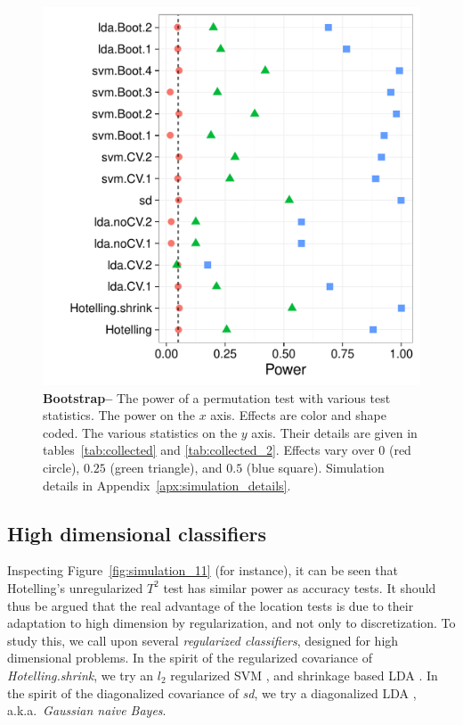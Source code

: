 \documentclass[12pt,a4paper]{article}
\begin{document}
\begin{figure}[ht]
\centering
	  \includegraphics[width=0.7\linewidth]{"art/2016-08-30 18:08:08"}
	  \caption{
		  \textbf{Bootstrap--}
		  The power of a permutation test with various test statistics. 
		  The power on the $x$ axis. 
		  Effects are color and shape coded. 
		  The various statistics on the $y$ axis. 
		  Their details are given in tables~\ref{tab:collected} and \ref{tab:collected_2}. 
		  Effects vary over $0$ (red circle), $0.25$ (green triangle), and $0.5$ (blue square). 
		  Simulation details in Appendix~\ref{apx:simulation_details}.
		  } 
	\label{fig:bootstrap}
\end{figure}


\subsection{High dimensional classifiers}
\label{sec:highdim}
Inspecting Figure~\ref{fig:simulation_11} (for instance), it can be seen that Hotelling's unregularized  $T^2$ test has similar power as accuracy tests. 
It should thus be argued that the real advantage of the location tests is due to their adaptation to high dimension by regularization, and not only to discretization.
To study this, we call upon several \emph{regularized classifiers}, designed for high dimensional problems. 
In the spirit of the regularized covariance of \emph{Hotelling.shrink}, we try an $l_2$ regularized SVM \citep{REF08a}, and shrinkage based LDA \citep{pang_shrinkage-based_2009,ramey_high-dimensional_2016}. %
In the spirit of the diagonalized covariance of \emph{sd}, we try a diagonalized LDA \citep{dudoit_comparison_2002}, a.k.a.\ \emph{Gaussian naive Bayes}. 
\end{document}
